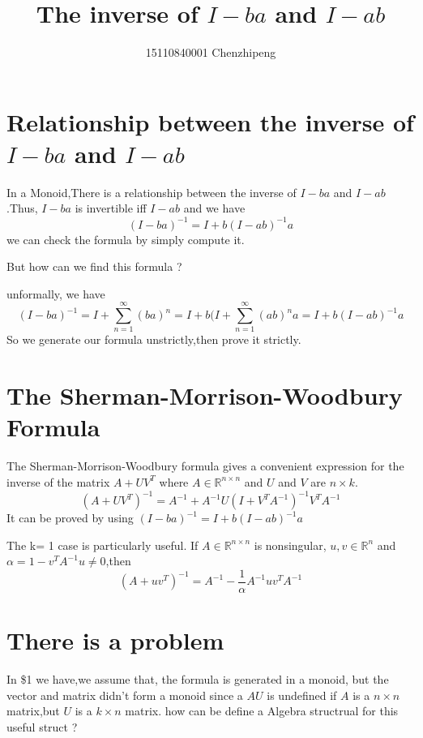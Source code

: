 \documentclass[a4paper,12pt]{article}
\author{15110840001 Chenzhipeng}
\title{The inverse of $I-ba$ and $I-ab$}
\begin{document}
\maketitle


\section{Relationship between the inverse of $I-ba$ and $I-ab$ }
In a Monoid,There is a relationship between the inverse of $I-ba$ and $I-ab$.Thus, $I-ba$ is invertible iff $I-ab$ and we have 
\[ (I-ba)^{-1} = I + b(I-ab)^{-1}a \]
we can check the formula by simply compute it.

But how can we find this formula ?

unformally, we have 
\[ (I-ba)^{-1} = I + \sum_{n=1}^{\infty}(ba)^n = I + b(I + \sum_{n=1}^{\infty}(ab)^n a = I + b(I-ab)^{-1}a \]
So we generate our formula unstrictly,then prove it strictly.

\section{The Sherman-Morrison-Woodbury Formula}

The Sherman-Morrison-Woodbury formula gives a convenient expression for the inverse of the matrix $A+UV^T$ where $A \in \mathbb{R}^{n \times n}$ and $U$ and $V$ are $n \times k$.
\[ (A+UV^T)^{-1} = A^{-1} + A^{-1}U(I+V^TA^{-1})^{-1}V^TA^{-1} \]
It can be proved by using $(I-ba)^{-1} = I + b(I-ab)^{-1}a$

The k= 1 case is particularly useful. If $A \in \mathbb{R}^{n \times n}$ is nonsingular, $u,v \in \mathbb{R}^n$ and $\alpha = 1-v^TA^{-1}u \neq 0$,then
\[ (A+uv^T)^{-1}  = A^{-1} - \frac{1}{\alpha} A^{-1} u v^T A^{-1}  \]

\section{There is a problem}
In \$1 we have,we assume that, the formula is generated in a monoid, but the vector and matrix didn't form a monoid since a $AU$ is undefined if $A$ is a $n \times n$ matrix,but $U$ is a $k \times n$ matrix. how can be define a Algebra structrual for this useful struct ?  

 
\end{document}
